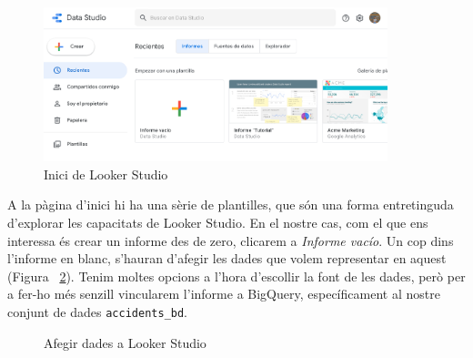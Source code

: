 \documentclass[12pt,longbibliography]{article}
\theoremstyle{definition}
\theoremstyle{remark}
\begin{document}
\begin{figure}[h!]
\begin{center}
\includegraphics[width=10cm]{ds1}
\end{center}
\caption{Inici de Looker Studio}
\label{fig:ds1}
\end{figure}

A la pàgina d’inici hi ha una sèrie de plantilles, que són una forma entretinguda d’explorar les capacitats de Looker Studio. En el nostre cas, com el que ens interessa és crear un informe des de zero, clicarem a \textit{Informe vacío}. Un cop dins l’informe en blanc, s’hauran d’afegir les dades que volem representar en aquest (Figura ~\ref{fig:ds2}). Tenim moltes opcions a l'hora d'escollir la font de les dades, però per a fer-ho més senzill vincularem l'informe a BigQuery, específicament al nostre conjunt de dades \verb|accidents_bd|.


\begin{figure}[h!]
\par
{}%
\hfill
{}%
\par

\caption{Afegir dades a Looker Studio}
\label{fig:ds2}
\end{figure}
\end{document}
